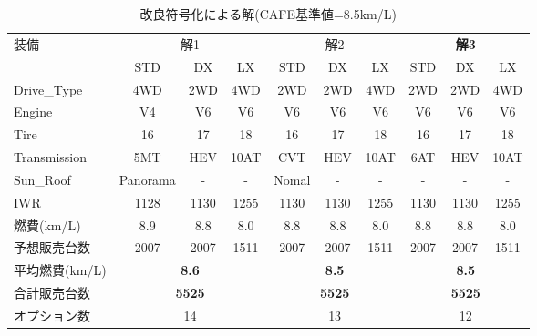 \begin{table*}[t]
 \caption{改良符号化による解(CAFE基準値=8.5km/L)}
 \centering
 \small
 \begin{tabular}{l|c|c|c||c|c|c||c|c|c} \bhline
    装備     & \multicolumn{3}{c||}{解1} & \multicolumn{3}{c||}{解2} & \multicolumn{3}{c}{\bf{解3}}\\ \cline{2-10}
                 & STD	& DX 	 & LX	   & STD & DX  & LX    & STD & DX  & LX       \\  \hline
    Drive\_Type  & 4WD  & 2WD    & 4WD     & 2WD & 2WD & 4WD   & 2WD & 2WD & 4WD     \\
    Engine	 & V4	& V6	 & V6	   & V6  & V6  & V6    & V6  & V6  & V6      \\ 
    Tire	 & 16	& 17	 & 18	   & 16  & 17  & 18    & 16  & 17  & 18     \\
    Transmission & 5MT	& HEV    & 10AT	   & CVT & HEV & 10AT  & 6AT & HEV & 10AT     \\
    Sun\_Roof    & Panorama& -   & -       & Nomal& -  & -     & -   & -   & -       \\ \hline
    IWR          & 1128 & 1130   & 1255    & 1130 & 1130&1255  & 1130& 1130& 1255     \\ %
    燃費(km/L)    & 8.9 & 8.8    & 8.0     & 8.8 & 8.8  & 8.0 & 8.8  & 8.8  & 8.0         \\ %
    予想販売台数  & 2007  & 2007   & 1511   & 2007 & 2007 & 1511 & 2007& 2007& 1511       \\ \hline
    平均燃費(km/L) & \multicolumn{3}{c||}{\bf{8.6}} & \multicolumn{3}{c||}{\bf{8.5}} & \multicolumn{3}{c}{\bf{8.5}}\\ 
    合計販売台数  & \multicolumn{3}{c||}{\bf{5525}} & \multicolumn{3}{c||}{\bf{5525}}  &\multicolumn{3}{c}{\bf{5525}}\\
    オプション数  & \multicolumn{3}{c||}{14} & \multicolumn{3}{c||}{13}  &\multicolumn{3}{c}{12}\\ \hline
  \end{tabular}
 \label{tab:optN}
\end{table*}




